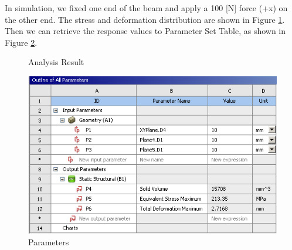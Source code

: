 \documentclass[12pt]{kjleehw}
\begin{document}
\begin{CJK}{UTF8}{bkai}
In simulation, we fixed one end of the beam and apply a 100 [N] force (+x) on the other end. The stress and deformation distribution are shown in Figure \ref{fig:anslysis}. Then we can retrieve the response values to Parameter Set Table, as shown in Figure \ref{fig:parameters}.

\begin{figure}[h]
	\centering
  \caption{Analysis Result}
  \label{fig:anslysis}
\end{figure}

\begin{figure}[h]
	\centering
	\includegraphics[scale=0.65]{figure/parameters.png}
	\caption{Parameters}
	\label{fig:parameters}
\end{figure}


\end{CJK}
\end{document}
